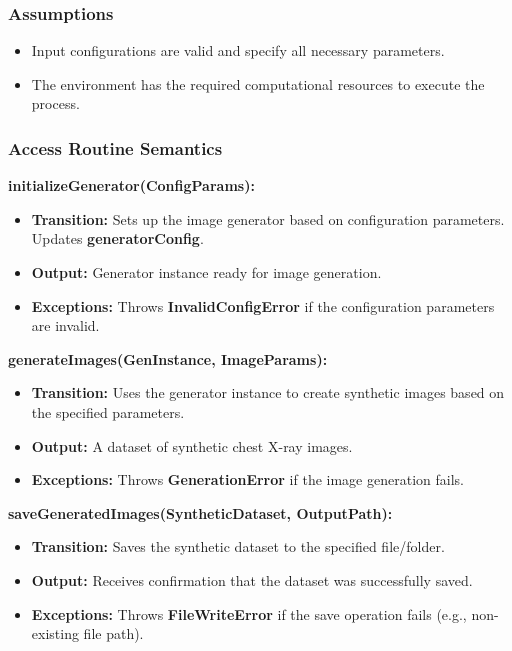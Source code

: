 \documentclass[12pt, titlepage]{article}
\begin{document}
\subsubsection{Assumptions}
\begin{itemize}
    \item Input configurations are valid and specify all necessary parameters.
    \item The environment has the required computational resources to execute the process.
\end{itemize}

\subsubsection{Access Routine Semantics}

\noindent \textbf{initializeGenerator(ConfigParams):}
\begin{itemize}
    \item \textbf{Transition:} Sets up the image generator based on configuration parameters. Updates \textbf{generatorConfig}.
    \item \textbf{Output:} Generator instance ready for image generation.
    \item \textbf{Exceptions:} Throws \textbf{InvalidConfigError} if the configuration parameters are invalid.
\end{itemize}

\noindent \textbf{generateImages(GenInstance, ImageParams):}
\begin{itemize}
    \item \textbf{Transition:} Uses the generator instance to create synthetic images based on the specified parameters.
    \item \textbf{Output:} A dataset of synthetic chest X-ray images.
    \item \textbf{Exceptions:} Throws \textbf{GenerationError} if the image generation fails.
\end{itemize}

\noindent \textbf{saveGeneratedImages(SyntheticDataset, OutputPath):}
\begin{itemize}
    \item \textbf{Transition:} Saves the synthetic dataset to the specified file/folder.
    \item \textbf{Output:} Receives confirmation that the dataset was successfully saved.
    \item \textbf{Exceptions:} Throws \textbf{FileWriteError} if the save operation fails (e.g., non-existing file path).
\end{itemize}
\newpage
\end{document}
